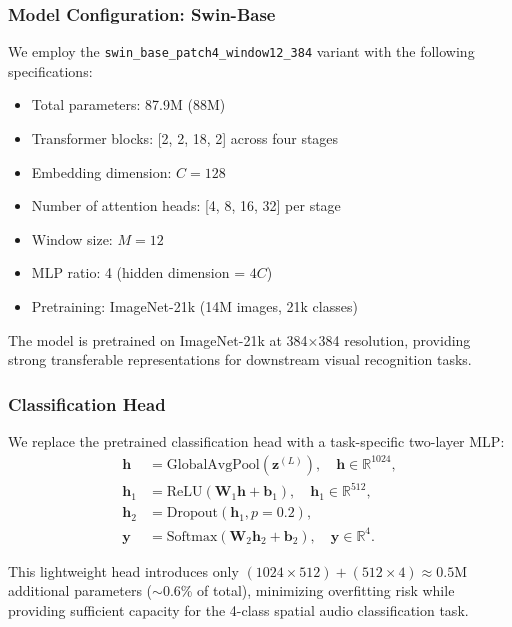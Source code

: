 \documentclass[11pt,a4paper]{article}
\begin{document}
\subsubsection{Model Configuration: Swin-Base}

We employ the \texttt{swin\_base\_patch4\_window12\_384} variant with the following specifications:
\begin{itemize}[leftmargin=*]
    \item Total parameters: 87.9M (88M)
    \item Transformer blocks: [2, 2, 18, 2] across four stages
    \item Embedding dimension: \(C=128\)
    \item Number of attention heads: [4, 8, 16, 32] per stage
    \item Window size: \(M=12\)
    \item MLP ratio: 4 (hidden dimension = \(4C\))
    \item Pretraining: ImageNet-21k (14M images, 21k classes)
\end{itemize}

The model is pretrained on ImageNet-21k at 384\(\times\)384 resolution, providing strong transferable representations for downstream visual recognition tasks.

\subsubsection{Classification Head}

We replace the pretrained classification head with a task-specific two-layer MLP:
\begin{align}
\mathbf{h} &= \mathrm{GlobalAvgPool}(\mathbf{z}^{(L)}), \quad \mathbf{h} \in \mathbb{R}^{1024}, \\
\mathbf{h}_1 &= \mathrm{ReLU}(\mathbf{W}_1 \mathbf{h} + \mathbf{b}_1), \quad \mathbf{h}_1 \in \mathbb{R}^{512}, \\
\mathbf{h}_2 &= \mathrm{Dropout}(\mathbf{h}_1, p=0.2), \\
\mathbf{y} &= \mathrm{Softmax}(\mathbf{W}_2 \mathbf{h}_2 + \mathbf{b}_2), \quad \mathbf{y} \in \mathbb{R}^{4}.
\end{align}

This lightweight head introduces only \((1024 \times 512) + (512 \times 4) \approx 0.5\)M additional parameters (\(\sim\)0.6\% of total), minimizing overfitting risk while providing sufficient capacity for the 4-class spatial audio classification task.
\end{document}
